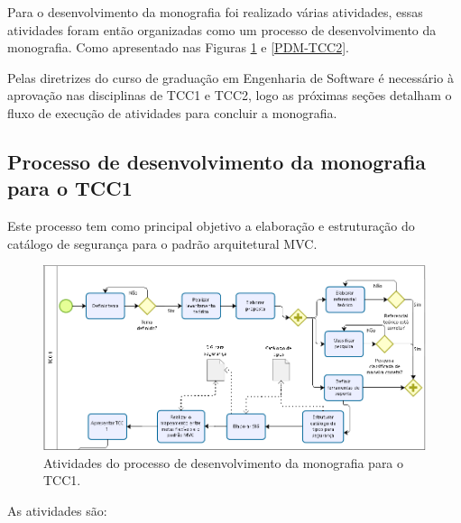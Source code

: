 Para o desenvolvimento da monografia foi realizado várias atividades, essas atividades foram então organizadas como um processo de desenvolvimento da monografia. Como apresentado nas Figuras \ref{PDM-TCC1} e \ref{PDM-TCC2}. 

Pelas diretrizes do curso de graduação em Engenharia de Software é necessário à aprovação nas disciplinas de TCC1 e TCC2, logo as próximas seções detalham o fluxo de execução de atividades para concluir a monografia. 



\subsection{Processo de desenvolvimento da monografia para o TCC1}

Este processo tem como principal objetivo a elaboração e estruturação do catálogo de segurança para o padrão arquitetural MVC. 

\begin{figure}[h!]
	\centering
	\includegraphics[keepaspectratio=true,scale=0.6]{figuras/PDM-TCC1.PNG}
	\caption{Atividades do processo de desenvolvimento da monografia para o TCC1.}
	\label{PDM-TCC1}
\end{figure}

As atividades são:

